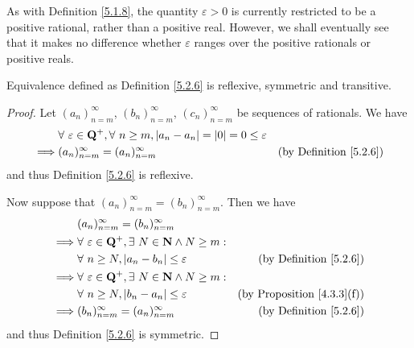 \begin{remark}\label{5.2.7}
    As with Definition \ref{5.1.8}, the quantity \(\varepsilon > 0\) is currently restricted to be a positive rational, rather than a positive real.
    However, we shall eventually see that it makes no difference whether \(\varepsilon\) ranges over the positive rationals or positive reals.
\end{remark}

\begin{additional corollary}\label{ac 5.2.1}
Equivalence defined as Definition \ref{5.2.6} is reflexive, symmetric and transitive.
\end{additional corollary}

\begin{proof}
    Let \((a_n)_{n = m}^\infty\), \((b_n)_{n = m}^\infty\), \((c_n)_{n = m}^\infty\) be sequences of rationals.
    We have
    \begin{align*}
                 & \forall\ \varepsilon \in \mathbf{Q}^+, \forall\ n \geq m, \abs*{a_n - a_n} = \abs*{0} = 0 \leq \varepsilon                                      \\
        \implies & (a_n)_{n = m}^\infty = (a_n)_{n = m}^\infty                                                                & \text{(by Definition \ref{5.2.6})}
    \end{align*}
    and thus Definition \ref{5.2.6} is reflexive.

    Now suppose that \((a_n)_{n = m}^\infty = (b_n)_{n = m}^\infty\).
    Then we have
    \begin{align*}
                 & (a_n)_{n = m}^\infty = (b_n)_{n = m}^\infty                                                                               \\
        \implies & \forall\ \varepsilon \in \mathbf{Q}^+, \exists\ N \in \mathbf{N} \land N \geq m:                                          \\
                 & \forall\ n \geq N, \abs*{a_n - b_n} \leq \varepsilon                             & \text{(by Definition \ref{5.2.6})}     \\
        \implies & \forall\ \varepsilon \in \mathbf{Q}^+, \exists\ N \in \mathbf{N} \land N \geq m:                                          \\
                 & \forall\ n \geq N, \abs*{b_n - a_n} \leq \varepsilon                             & \text{(by Proposition \ref{4.3.3}(f))} \\
        \implies & (b_n)_{n = m}^\infty = (a_n)_{n = m}^\infty                                      & \text{(by Definition \ref{5.2.6})}
    \end{align*}
    and thus Definition \ref{5.2.6} is symmetric.


\end{proof}
